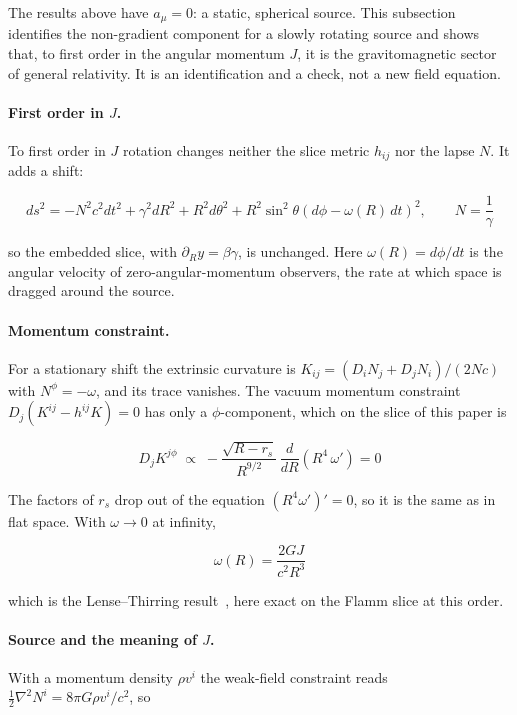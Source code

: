 \documentclass[pdflatex,sn-mathphys-num]{sn-jnl}%
\theoremstyle{thmstyleone}%
\theoremstyle{thmstyletwo}%
\theoremstyle{thmstylethree}%
\begin{document}
The results above have $a_\mu=0$: a static, spherical source. This subsection identifies the non-gradient component for a slowly rotating source and shows that, to first order in the angular momentum $J$, it is the gravitomagnetic sector of general relativity. It is an identification and a check, not a new field equation.

\paragraph{First order in $J$.} To first order in $J$ rotation changes neither the slice metric $h_{ij}$ nor the lapse $N$. It adds a shift:

\begin{equation}\label{eq_slow_rotation}
    ds^2=-N^2c^2dt^2+\gamma^2dR^2+R^2d\theta^2+R^2\sin^2\theta\left(d\phi-\omega(R)\,dt\right)^2,
    \qquad N=\frac1\gamma
\end{equation}

so the embedded slice, with $\partial_Ry=\beta\gamma$, is unchanged. Here $\omega(R)=d\phi/dt$ is the angular velocity of zero-angular-momentum observers, the rate at which space is dragged around the source.

\paragraph{Momentum constraint.} For a stationary shift the extrinsic curvature is $K_{ij}=\left(D_iN_j+D_jN_i\right)/(2Nc)$ with $N^\phi=-\omega$, and its trace vanishes. The vacuum momentum constraint $D_j\!\left(K^{ij}-h^{ij}K\right)=0$ has only a $\phi$-component, which on the slice of this paper is

\begin{equation}\label{eq_momentum_vacuum}
    D_jK^{j\phi}\;\propto\;-\frac{\sqrt{R-r_s}}{R^{9/2}}\,\frac{d}{dR}\!\left(R^4\,\omega'\right)=0
\end{equation}

The factors of $r_s$ drop out of the equation $\left(R^4\omega'\right)'=0$, so it is the same as in flat space. With $\omega\to0$ at infinity,

\begin{equation}\label{eq_lt_solution}
    \omega(R)=\frac{2GJ}{c^2R^3}
\end{equation}

which is the Lense--Thirring result~\cite{LenseThirring1918}, here exact on the Flamm slice at this order.


\paragraph{Source and the meaning of $J$.} With a momentum density $\rho v^i$ the weak-field constraint reads $\tfrac12\nabla^2N^i=8\pi G\rho v^i/c^2$, so
\end{document}
